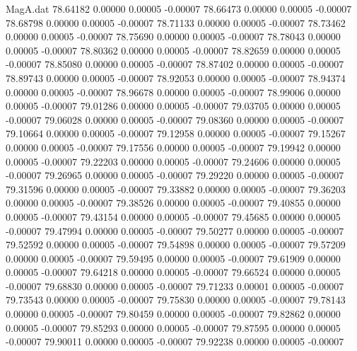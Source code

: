 \begin{filecontents}{MagA.dat}
  78.64182    0.00000    0.00005   -0.00007
  78.66473    0.00000    0.00005   -0.00007
  78.68798    0.00000    0.00005   -0.00007
  78.71133    0.00000    0.00005   -0.00007
  78.73462    0.00000    0.00005   -0.00007
  78.75690    0.00000    0.00005   -0.00007
  78.78043    0.00000    0.00005   -0.00007
  78.80362    0.00000    0.00005   -0.00007
  78.82659    0.00000    0.00005   -0.00007
  78.85080    0.00000    0.00005   -0.00007
  78.87402    0.00000    0.00005   -0.00007
  78.89743    0.00000    0.00005   -0.00007
  78.92053    0.00000    0.00005   -0.00007
  78.94374    0.00000    0.00005   -0.00007
  78.96678    0.00000    0.00005   -0.00007
  78.99006    0.00000    0.00005   -0.00007
  79.01286    0.00000    0.00005   -0.00007
  79.03705    0.00000    0.00005   -0.00007
  79.06028    0.00000    0.00005   -0.00007
  79.08360    0.00000    0.00005   -0.00007
  79.10664    0.00000    0.00005   -0.00007
  79.12958    0.00000    0.00005   -0.00007
  79.15267    0.00000    0.00005   -0.00007
  79.17556    0.00000    0.00005   -0.00007
  79.19942    0.00000    0.00005   -0.00007
  79.22203    0.00000    0.00005   -0.00007
  79.24606    0.00000    0.00005   -0.00007
  79.26965    0.00000    0.00005   -0.00007
  79.29220    0.00000    0.00005   -0.00007
  79.31596    0.00000    0.00005   -0.00007
  79.33882    0.00000    0.00005   -0.00007
  79.36203    0.00000    0.00005   -0.00007
  79.38526    0.00000    0.00005   -0.00007
  79.40855    0.00000    0.00005   -0.00007
  79.43154    0.00000    0.00005   -0.00007
  79.45685    0.00000    0.00005   -0.00007
  79.47994    0.00000    0.00005   -0.00007
  79.50277    0.00000    0.00005   -0.00007
  79.52592    0.00000    0.00005   -0.00007
  79.54898    0.00000    0.00005   -0.00007
  79.57209    0.00000    0.00005   -0.00007
  79.59495    0.00000    0.00005   -0.00007
  79.61909    0.00000    0.00005   -0.00007
  79.64218    0.00000    0.00005   -0.00007
  79.66524    0.00000    0.00005   -0.00007
  79.68830    0.00000    0.00005   -0.00007
  79.71233    0.00001    0.00005   -0.00007
  79.73543    0.00000    0.00005   -0.00007
  79.75830    0.00000    0.00005   -0.00007
  79.78143    0.00000    0.00005   -0.00007
  79.80459    0.00000    0.00005   -0.00007
  79.82862    0.00000    0.00005   -0.00007
  79.85293    0.00000    0.00005   -0.00007
  79.87595    0.00000    0.00005   -0.00007
  79.90011    0.00000    0.00005   -0.00007
  79.92238    0.00000    0.00005   -0.00007
\end{filecontents}
